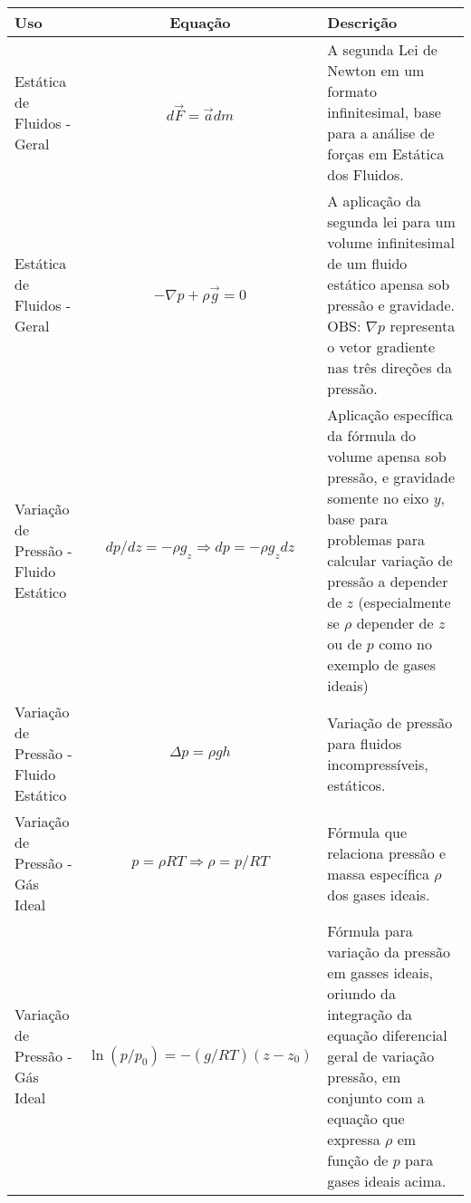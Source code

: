 \documentclass{article}
\begin{document}
\begin{table}[h]\tiny
    \begin{tabularx}{\textwidth}{|l|c|X|}\hline
        \textbf{Uso}                                         & \textbf{Equação}                                  & \textbf{Descrição}                                                                                                                               \\ \hline

        \rule{0pt}{7ex}Estática de Fluidos - Geral           & $d\vec{F} = \vec{a} dm$                           & A segunda Lei de Newton em um formato infinitesimal, base para a análise de forças em Estática dos Fluidos.                                      \\[4ex] \hline
        \rule{0pt}{7ex}Estática de Fluidos - Geral           & $- \nabla p + \rho \vec g = 0$                    & A aplicação da segunda lei para um volume infinitesimal de um fluido estático apensa sob pressão e gravidade. OBS: $\nabla p$ representa o vetor
        gradiente nas três direções da pressão.                                                                                                                                                                                                                     \\ [4ex]\hline

        \rule{0pt}{7ex}Variação de Pressão - Fluido Estático & $dp/dz = -\rho g_z \Rightarrow dp = -\rho g_z dz$ & Aplicação específica da fórmula do volume apensa sob pressão, e gravidade somente no eixo
        $y$, base para problemas para calcular variação de pressão a depender de $z$ (especialmente se $\rho$ depender de $z$ ou de $p$ como no exemplo de gases ideais)                                                                                            \\ [4ex]\hline

        \rule{0pt}{7ex}Variação de Pressão - Fluido Estático & $\Delta p = \rho g h$                             & Variação de pressão para fluidos incompressíveis, estáticos.                                                                                     \\ [4ex]\hline

        \rule{0pt}{7ex}Variação de Pressão - Gás Ideal       & $p = \rho RT \Rightarrow \rho = p/RT$             & Fórmula que relaciona pressão e massa específica $\rho$ dos gases ideais.                                                                        \\ [4ex]\hline

        \rule{0pt}{7ex}Variação de Pressão - Gás Ideal       & $\ln{(p/p_0)} = -(g/RT)(z - z_0)$                 & Fórmula para variação da pressão em gasses ideais, oriundo da integração da equação diferencial geral de variação
        pressão, em conjunto com a equação que expressa $\rho$ em função de $p$ para gases ideais acima.                                                                                                                                                            \\ [4ex]\hline
    \end{tabularx}
\end{table}
\end{document}
